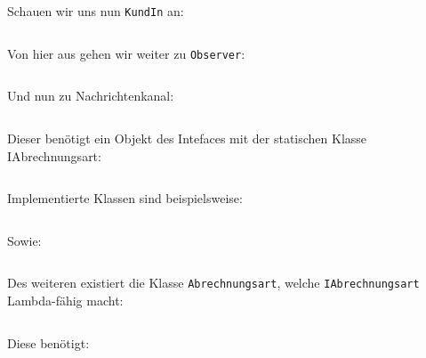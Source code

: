 \documentclass{article}
\begin{document}
\begin{enumerate}[label=\alph*.]
        \newpage
        Schauen wir uns nun \texttt{KundIn} an:
        \inputminted{java}{KundIn.java}

        \newpage
        Von hier aus gehen wir weiter zu \texttt{Observer}:
        \inputminted{java}{Observer.java}

        \newpage
        Und nun zu Nachrichtenkanal:
        \inputminted{java}{Nachrichtenkanal.java}

        Dieser benötigt ein Objekt des Intefaces mit der statischen Klasse IAbrechnungsart:
        \inputminted{java}{IAbrechnungsart.java}

        \newpage
        Implementierte Klassen sind beispielsweise:
        \inputminted{java}{Postpaid.java}
        Sowie:
        \inputminted{java}{ZahleProZeichen.java}

        \newpage
        Des weiteren existiert die Klasse \texttt{Abrechnungsart}, welche \texttt{IAbrechnungsart} Lambda-fähig macht:
        \inputminted{java}{Abrechnungsart.java}

        Diese benötigt:
        \inputminted{java}{IBerechne.java}
    \end{enumerate}
\end{document}
